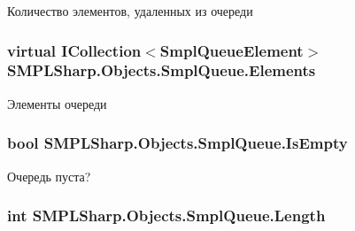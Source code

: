 Количество элементов, удаленных из очереди 

\hypertarget{class_s_m_p_l_sharp_1_1_objects_1_1_smpl_queue_a615e74aa9a4f6d4c82468cafcf20bc71}{
\subsubsection[{Elements}]{\setlength{\rightskip}{0pt plus 5cm}virtual I\-Collection$<${\bf Smpl\-Queue\-Element}$>$ S\-M\-P\-L\-Sharp.\-Objects.\-Smpl\-Queue.\-Elements\hspace{0.3cm}{\ttfamily [get]}}}\label{d3/ded/class_s_m_p_l_sharp_1_1_objects_1_1_smpl_queue_a615e74aa9a4f6d4c82468cafcf20bc71}


Элементы очереди 

\hypertarget{class_s_m_p_l_sharp_1_1_objects_1_1_smpl_queue_a740725209155ade0c50d3e259967dbd1}{
\subsubsection[{Is\-Empty}]{\setlength{\rightskip}{0pt plus 5cm}bool S\-M\-P\-L\-Sharp.\-Objects.\-Smpl\-Queue.\-Is\-Empty\hspace{0.3cm}{\ttfamily [get]}}}\label{d3/ded/class_s_m_p_l_sharp_1_1_objects_1_1_smpl_queue_a740725209155ade0c50d3e259967dbd1}


Очередь пуста? 

\hypertarget{class_s_m_p_l_sharp_1_1_objects_1_1_smpl_queue_a90750620f30441f6df56f42072648e45}{
\subsubsection[{Length}]{\setlength{\rightskip}{0pt plus 5cm}int S\-M\-P\-L\-Sharp.\-Objects.\-Smpl\-Queue.\-Length\hspace{0.3cm}{\ttfamily [get]}}}\label{d3/ded/class_s_m_p_l_sharp_1_1_objects_1_1_smpl_queue_a90750620f30441f6df56f42072648e45}


